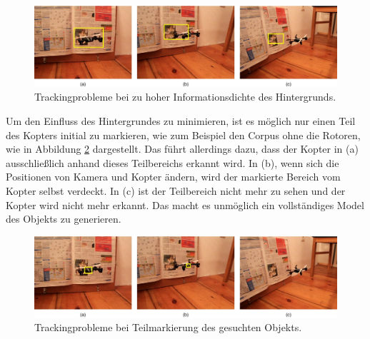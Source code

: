 	\begin{figure}[H]
		\begin{centering}
			\includegraphics[scale=0.5]{../pictures/problem_background_1.jpg}
			\caption{Trackingprobleme bei zu hoher Informationsdichte des Hintergrunds.}
			\label{abb:problem_background_1}
			\par
		\end{centering}
	\end{figure}

	Um den Einfluss des Hintergrundes zu minimieren, ist es möglich nur einen Teil des Kopters initial zu markieren, wie zum Beispiel den Corpus ohne die Rotoren, wie in Abbildung \ref{abb:problem_background_2} dargestellt. Das führt allerdings dazu, dass der Kopter in (a) ausschließlich anhand dieses Teilbereichs erkannt wird. In (b), wenn sich die Positionen von Kamera und Kopter ändern, wird der markierte Bereich vom Kopter selbst verdeckt. In (c) ist der Teilbereich nicht mehr zu sehen und der Kopter wird nicht mehr erkannt. Das macht es unmöglich ein vollständiges Model des Objekts zu generieren.

	\begin{figure}[H]
		\begin{centering}
			\includegraphics[scale=0.5]{../pictures/problem_background_2.jpg}
			\caption{Trackingprobleme bei Teilmarkierung des gesuchten Objekts.}
			\label{abb:problem_background_2}
			\par
		\end{centering}
	\end{figure}



